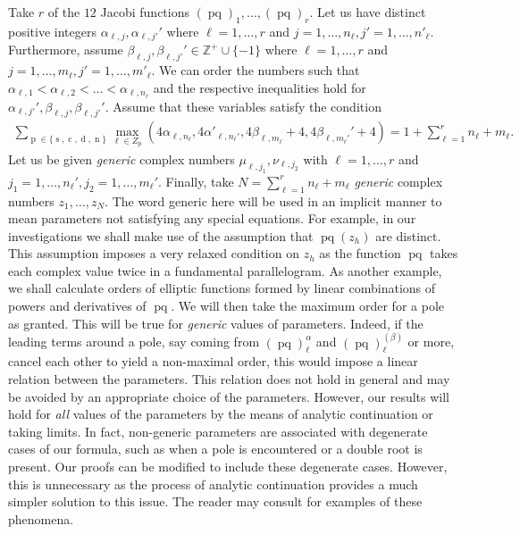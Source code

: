 \documentclass{amsart}
\theoremstyle{definition}
\DeclareMathOperator{\pq}{pq}
\DeclareMathOperator{\p}{p}
\DeclareMathOperator{\s}{s}
\DeclareMathOperator{\cJ}{c}
\DeclareMathOperator{\dJ}{d}
\DeclareMathOperator{\n}{n}
\begin{document}
Take $r$ of the $12$ Jacobi functions $(\pq)_1,\ldots, (\pq)_r$. Let us have distinct positive integers $\alpha_{\ell,j},\alpha_{\ell,j'}'$ where $\ell=1,\ldots, r$ and $j=1,\ldots, n_\ell, j'=1,\ldots,n'_\ell$. Furthermore, assume $\beta_{\ell,j},\beta_{\ell,j'}'\in \mathbb{Z}^+\cup\{-1\}$ where $\ell=1,\ldots, r$ and $j=1,\ldots, m_\ell, j'=1,\ldots,m'_\ell$. We can order the numbers such that $\alpha_{\ell,1}< \alpha_{\ell,2}< \ldots < \alpha_{\ell,n_\ell}$ and the respective inequalities hold for $\alpha_{\ell,j'}',\beta_{\ell,j},\beta_{\ell,j'}'$. Assume that these variables satisfy the condition
\begin{align}\label{VarCond}
    \sum_{\p\in\{\s,\cJ,\dJ,\n \}} \max_{\ell\in Z_{\p}}\left(4\alpha_ {\ell,n_\ell},4\alpha'_{\ell,n_\ell'},4\beta_{\ell,m_\ell}+4,4\beta_{\ell,m_\ell'}'+4  \right)=1+\sum_{\ell=1}^r n_\ell+m_\ell.
\end{align}
Let us be given \textit{generic} complex numbers $\mu_{\ell,j_1},\nu_{\ell,j_2}$ with $\ell=1,\ldots,r$ and $j_1=1,\ldots, n_\ell', j_2=1,\ldots,m_\ell'$. Finally, take $N=\sum_{\ell=1}^r n_\ell+m_\ell$ \textit{generic} complex numbers $z_1,\ldots, z_N$. The word generic here will be used in an implicit manner to mean parameters not satisfying any special equations. For example, in our investigations we shall make use of the assumption that $\pq(z_h)$ are distinct. This assumption imposes a very relaxed condition on $z_h$ as the function $\pq$ takes each complex value twice in a fundamental parallelogram. As another example, we shall calculate orders of elliptic functions formed by linear combinations of powers and derivatives of $\pq$. We will then take the maximum order for a pole as granted. This will be true for \textit{generic} values of parameters. Indeed, if the leading terms around a pole, say coming from $(\pq)_\ell^{\alpha}$ and $(\pq)_\ell^{(\beta)}$ or more, cancel each other to yield a non-maximal order, this would impose a linear relation between the parameters. This relation does not hold in general and may be avoided by an appropriate choice of the parameters. However, our results will hold for \textit{all} values of the parameters by the means of analytic continuation or taking limits. In fact, non-generic parameters are associated with degenerate cases of our formula, such as when a pole is encountered or a double root is present. Our proofs can be modified to include these degenerate cases. However, this is unnecessary as the process of analytic continuation provides a much simpler solution to this issue. The reader may consult \cite{Gürel} for examples of these phenomena. \medskip
\end{document}
